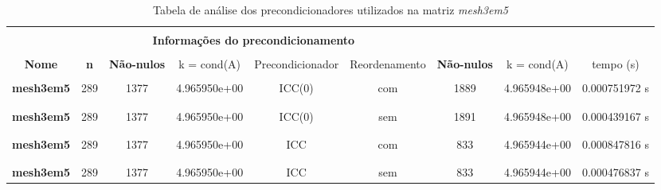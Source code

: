 
\begin{table}[ht]
    \centering
    \begin{tabular}{|c|c|c|c|c|c|c|c|c|}
        \hline \rowcolor{Gray}
        \multicolumn{9}{|c|}{\bfseries Tabela de analise dos precondicionadores }\\
        \hline \rowcolor{Gray}  \multicolumn{4}{|c|}{} & \multicolumn{5}{|c|}{} \\
         [-1em]  \rowcolor{Gray}
         \multicolumn{4}{|c|}{\bfseries Informações da matriz } & \multicolumn{5}{|c|}{\bfseries Informações do precondicionamento }\\
         \hline \rowcolor{Gray} & & & & & & & &  \\
         [-1em]
         \rowcolor{Gray}
         \bfseries Nome & \bfseries n & \bfseries Não-nulos &  
         k = cond(A) & Precondicionador & Reordenamento &
         \bfseries Não-nulos &  
         k = cond(A)  & tempo (s) \\
         \hline \\
         [-1em] \bfseries mesh3em5 & 289 & 1377 & 4.965950e+00 & ICC(0) & com & 1889 & 4.965948e+00 & 0.000751972 s \\ & & & & & & & & \\ [-1em] \hline \\
         [-1em] \bfseries mesh3em5 & 289 & 1377 & 4.965950e+00 & ICC(0) & sem & 1891 & 4.965948e+00 & 0.000439167 s \\ & & & & & & & & \\ [-1em] \hline \\
         [-1em] \bfseries mesh3em5 & 289 & 1377 & 4.965950e+00 & ICC & com & 833 & 4.965944e+00 & 0.000847816 s \\ & & & & & & & & \\ [-1em] \hline \\
         [-1em] \bfseries mesh3em5 & 289 & 1377 & 4.965950e+00 & ICC & sem & 833 & 4.965944e+00 & 0.000476837 s \\ \hline
    \end{tabular}
    \caption{Tabela de análise dos precondicionadores utilizados na matriz \textit{mesh3em5}}
    \label{tab:precond-mesh}
\end{table}


